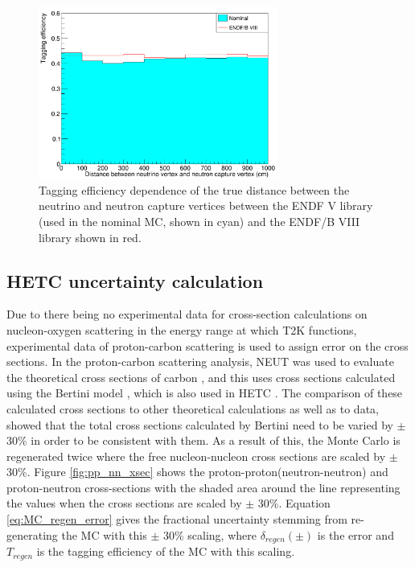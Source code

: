 \begin{figure}[!htb]
\centering
    \includegraphics[width=0.7\textwidth]{Figures/endf8_tageff_plot.PNG}
\caption{Tagging efficiency dependence of the true distance between the neutrino and neutron capture vertices between the ENDF V library (used in the nominal MC, shown in cyan) and the ENDF/B VIII library shown in red.}
\label{fig:ENDF8_syst_error}
\end{figure}

\subsection{HETC uncertainty calculation}

Due to there being no experimental data for cross-section calculations on nucleon-oxygen scattering in the energy range at which T2K functions, experimental data of proton-carbon scattering is used to assign error on the cross sections. In the proton-carbon scattering analysis, NEUT was used to evaluate the theoretical cross sections of carbon \cite{hayato_neut}, and this uses cross sections calculated using the Bertini model \cite{bertini_hetc}, which is also used in HETC \cite{hetc_paper}. The comparison of these calculated cross sections to other theoretical calculations as well as to data, showed that the total cross sections calculated by Bertini need to be varied by $\pm$ 30\% in order to be consistent with them. As a result of this, the Monte Carlo is regenerated twice where the free nucleon-nucleon cross sections are scaled by $\pm$ 30\%. Figure \ref{fig:pp_nn_xsec} shows the proton-proton(neutron-neutron) and proton-neutron cross-sections with the shaded area around the line representing the values when the cross sections are scaled by $\pm$ 30\%. Equation \ref{eq:MC_regen_error} gives the fractional uncertainty stemming from re-generating the MC with this $\pm$ 30\% scaling, where $\delta_{regen}(\pm)$ is the error and $T_{regen}$ is the tagging efficiency of the MC with this scaling.



